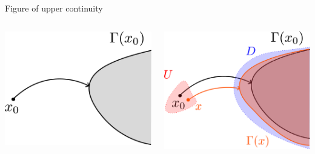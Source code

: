 \documentclass[aspectratio=169, dvipdfmx, 11pt]{beamer} %
\begin{document}
\begin{frame}[t]{Figure of upper continuity}
  \centering
  \begin{columns}
    \begin{column}{0.48\textwidth}
    \centering
    \includegraphics[keepaspectratio, scale=0.16]{figures/continuities/set_valued_mapping.eps}
    \end{column}
    \pause
    \begin{column}{0.48\textwidth}
    \centering
    \includegraphics[keepaspectratio, scale=0.16]{figures/continuities/upper_continuity.eps}
    \end{column}
  \end{columns}
\end{frame}
\end{document}
